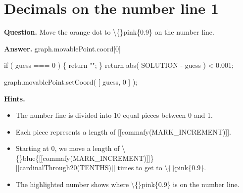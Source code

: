 \documentclass{article}
\begin{document}
\section*{Decimals on the number line 1}
\textbf{Question.} Move the orange dot to \textbackslash\{\}pink\{0.9\} on the number line.

\textbf{Answer.} graph.movablePoint.coord[0] 
                
                    if ( guess === 0 ) \{
                        return "";
                    \}
                    return abs( SOLUTION - guess ) < 0.001;
                
                
                    graph.movablePoint.setCoord( [ guess, 0 ] );

\textbf{Hints.}
\begin{itemize}
  \item The number line is divided into 10 equal pieces between
                    0 and 1.
  \item Each piece represents a length of [[commafy(MARK\_INCREMENT)]].
  \item Starting at 0, we move a length of
                    \textbackslash\{\}blue\{[[commafy(MARK\_INCREMENT)]]\} [[cardinalThrough20(TENTHS)]] times
                    to get to \textbackslash\{\}pink\{0.9\}.
  \item The highlighted number shows where \textbackslash\{\}pink\{0.9\} is on the number line.
\end{itemize}
\end{document}
